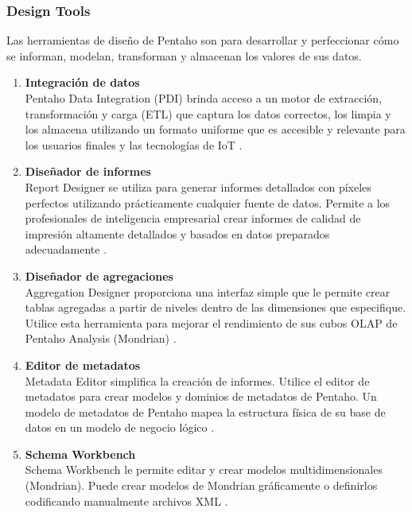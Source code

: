 \begin{spacing}{1.5}
	\subsubsection{Design Tools}
	Las herramientas de diseño de Pentaho son para desarrollar y perfeccionar cómo se informan, modelan, transforman y almacenan los valores de sus datos.
		\begin{enumerate}
			\item \textbf{Integración de datos}\\
			Pentaho Data Integration (PDI) brinda acceso a un motor de extracción, transformación y carga (ETL) que captura los datos correctos, los limpia y los almacena utilizando un formato uniforme que es accesible y relevante para los usuarios finales y las tecnologías de IoT \cite{chap2_pentaho}.
			
			\item \textbf{Diseñador de informes}\\
			Report Designer se utiliza para generar informes detallados con píxeles perfectos utilizando prácticamente cualquier fuente de datos. Permite a los profesionales de inteligencia empresarial crear informes de calidad de impresi\'{o}n altamente detallados y basados en datos preparados adecuadamente \cite{chap2_pentaho}.
		
			\item \textbf{Diseñador de agregaciones}\\
			Aggregation Designer proporciona una interfaz simple que le permite crear tablas agregadas a partir de niveles dentro de las dimensiones que especifique. Utilice esta herramienta para mejorar el rendimiento de sus cubos OLAP de Pentaho Analysis (Mondrian) \cite{chap2_pentaho}.
			
			\item \textbf{Editor de metadatos}\\
			Metadata Editor simplifica la creación de informes. Utilice el editor de metadatos para crear modelos y dominios de metadatos de Pentaho. Un modelo de metadatos de Pentaho mapea la estructura física de su base de datos en un modelo de negocio lógico \cite{chap2_pentaho}.
			
			\item \textbf{Schema Workbench}\\
			Schema Workbench le permite editar y crear modelos multidimensionales (Mondrian). Puede crear modelos de Mondrian gráficamente o definirlos codificando manualmente archivos XML \cite{chap2_pentaho}.
		\end{enumerate}

\end{spacing}
